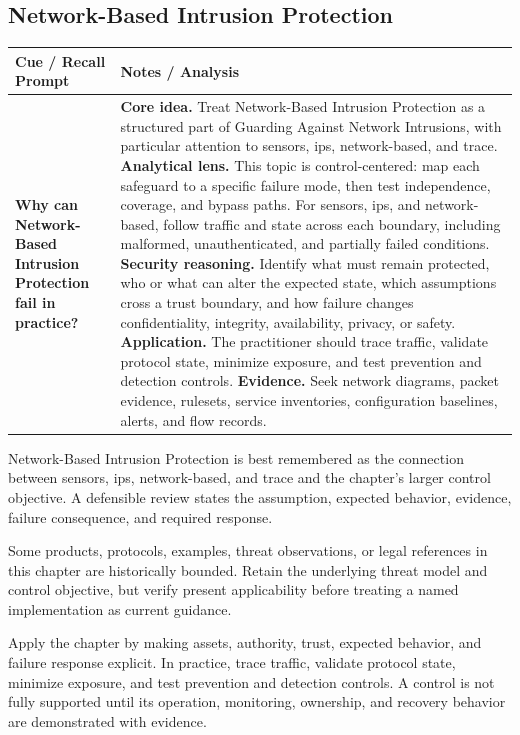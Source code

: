 \documentclass[11pt]{article}
\newcommand{\CornellHeader}{%
\rowcolor{Navy}\color{white}\bfseries Cue / Recall Prompt & \color{white}\bfseries Notes / Analysis\\\hline}
\newcommand{\CornellRow}[2]{%
\cellcolor{CueGray}\RaggedRight\textbf{#1} & \RaggedRight #2\\\hline}
\begin{document}
\subsection*{Network-Based Intrusion Protection}
\begin{longtable}{>{\RaggedRight\arraybackslash}p{}|>{\RaggedRight\arraybackslash}p{}}
\CornellHeader
\CornellRow{Why can Network-Based Intrusion Protection fail in practice?}{\textbf{Core idea.} Treat Network-Based Intrusion Protection as a structured part of Guarding Against Network Intrusions, with particular attention to sensors, ips, network-based, and trace. \textbf{Analytical lens.} This topic is control-centered: map each safeguard to a specific failure mode, then test independence, coverage, and bypass paths. For sensors, ips, and network-based, follow traffic and state across each boundary, including malformed, unauthenticated, and partially failed conditions. \textbf{Security reasoning.} Identify what must remain protected, who or what can alter the expected state, which assumptions cross a trust boundary, and how failure changes confidentiality, integrity, availability, privacy, or safety. \textbf{Application.} The practitioner should trace traffic, validate protocol state, minimize exposure, and test prevention and detection controls. \textbf{Evidence.} Seek network diagrams, packet evidence, rulesets, service inventories, configuration baselines, alerts, and flow records.}
\end{longtable}
\begin{topicsummary}
Network-Based Intrusion Protection is best remembered as the connection between sensors, ips, network-based, and trace and the chapter's larger control objective. A defensible review states the assumption, expected behavior, evidence, failure consequence, and required response.
\end{topicsummary}
\begin{historybox}
Some products, protocols, examples, threat observations, or legal references in this chapter are historically bounded. Retain the underlying threat model and control objective, but verify present applicability before treating a named implementation as current guidance.
\end{historybox}
\begin{defensebox}
Apply the chapter by making assets, authority, trust, expected behavior, and failure response explicit. In practice, trace traffic, validate protocol state, minimize exposure, and test prevention and detection controls. A control is not fully supported until its operation, monitoring, ownership, and recovery behavior are demonstrated with evidence.
\end{defensebox}
\end{document}
